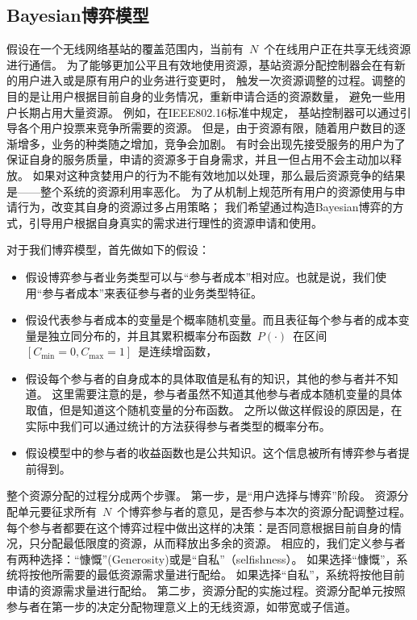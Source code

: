 \subsection{Bayesian博弈模型}
假设在一个无线网络基站的覆盖范围内，当前有~$N$~个在线用户正在共享无线资源进行通信。
为了能够更加公平且有效地使用资源，基站资源分配控制器会在有新的用户进入或是原有用户的业务进行变更时，
触发一次资源调整的过程。调整的目的是让用户根据目前自身的业务情况，重新申请合适的资源数量，
避免一些用户长期占用大量资源。
例如，在IEEE802.16标准中规定，
基站控制器可以通过引导各个用户投票来竞争所需要的资源。
但是，由于资源有限，随着用户数目的逐渐增多，业务的种类随之增加，竞争会加剧。
有时会出现先接受服务的用户为了保证自身的服务质量，申请的资源多于自身需求，并且一但占用不会主动加以释放。
如果对这种贪婪用户的行为不能有效地加以处理，那么最后资源竞争的结果是——整个系统的资源利用率恶化。
为了从机制上规范所有用户的资源使用与申请行为，改变其自身的资源过多占用策略；
我们希望通过构造Bayesian博弈的方式，引导用户根据自身真实的需求进行理性的资源申请和使用。

对于我们博弈模型，首先做如下的假设：
\begin{itemize}
    \item 假设博弈参与者业务类型可以与“参与者成本”相对应。也就是说，我们使用“参与者成本”来表征参与者的业务类型特征。
    \item 假设代表参与者成本的变量是个概率随机变量。而且表征每个参与者的成本变量是独立同分布的，并且其累积概率分布函数~$P(\cdot)$~在区间~$[C_{\min}=0, C_{\max}=1]$~是连续增函数，
    \item 假设每个参与者的自身成本的具体取值是私有的知识，其他的参与者并不知道。
    这里需要注意的是，参与者虽然不知道其他参与者成本随机变量的具体取值，但是知道这个随机变量的分布函数。
    之所以做这样假设的原因是，在实际中我们可以通过统计的方法获得参与者类型的概率分布。
    \item 假设模型中的参与者的收益函数也是公共知识。这个信息被所有博弈参与者提前得到。
\end{itemize}

整个资源分配的过程分成两个步骤。
第一步，是“用户选择与博弈”阶段。
资源分配单元要征求所有~$N$~个博弈参与者的意见，是否参与本次的资源分配调整过程。
每个参与者都要在这个博弈过程中做出这样的决策：是否同意根据目前自身的情况，只分配最低限度的资源，从而释放出多余的资源。
相应的，我们定义参与者有两种选择：“慷慨”(Generosity)或是“自私”（selfishness）。
如果选择“慷慨”，系统将按他所需要的最低资源需求量进行配给。
如果选择“自私”，系统将按他目前申请的资源需求量进行配给。
第二步，资源分配的实施过程。资源分配单元按照参与者在第一步的决定分配物理意义上的无线资源，如带宽或子信道。

